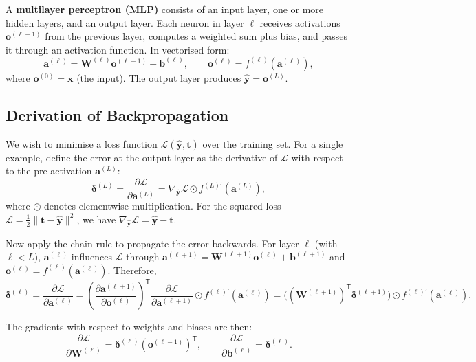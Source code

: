 \documentclass{tufte-handout}
\let\subsubsection\subsection
\begin{document}
A \textbf{multilayer perceptron (MLP)} consists of an input layer, one or more hidden layers, and an output layer. Each neuron in layer $\ell$ receives activations $\mathbf{o}^{(\ell-1)}$ from the previous layer, computes a weighted sum plus bias, and passes it through an activation function. In vectorised form:
\[
\mathbf{a}^{(\ell)} = \mathbf{W}^{(\ell)}\mathbf{o}^{(\ell-1)} + \mathbf{b}^{(\ell)},\qquad 
\mathbf{o}^{(\ell)} = f^{(\ell)}(\mathbf{a}^{(\ell)}),
\]
where $\mathbf{o}^{(0)} = \mathbf{x}$ (the input). The output layer produces $\hat{\mathbf{y}} = \mathbf{o}^{(L)}$.

\subsubsection{Derivation of Backpropagation}

We wish to minimise a loss function $\mathcal{L}(\hat{\mathbf{y}}, \mathbf{t})$ over the training set. For a single example, define the error at the output layer as the derivative of $\mathcal{L}$ with respect to the pre‑activation $\mathbf{a}^{(L)}$:
\[
\boldsymbol{\delta}^{(L)} = \frac{\partial \mathcal{L}}{\partial \mathbf{a}^{(L)}} = \nabla_{\hat{\mathbf{y}}}\mathcal{L} \odot f^{(L)'}(\mathbf{a}^{(L)}),
\]
where $\odot$ denotes elementwise multiplication. For the squared loss $\mathcal{L} = \frac12\|\mathbf{t}-\hat{\mathbf{y}}\|^2$, we have $\nabla_{\hat{\mathbf{y}}}\mathcal{L} = \hat{\mathbf{y}} - \mathbf{t}$.

Now apply the chain rule to propagate the error backwards. For layer $\ell$ (with $\ell < L$), $\mathbf{a}^{(\ell)}$ influences $\mathcal{L}$ through $\mathbf{a}^{(\ell+1)} = \mathbf{W}^{(\ell+1)}\mathbf{o}^{(\ell)} + \mathbf{b}^{(\ell+1)}$ and $\mathbf{o}^{(\ell)} = f^{(\ell)}(\mathbf{a}^{(\ell)})$. Therefore,
\[
\boldsymbol{\delta}^{(\ell)} = \frac{\partial \mathcal{L}}{\partial \mathbf{a}^{(\ell)}} 
= \left( \frac{\partial \mathbf{a}^{(\ell+1)}}{\partial \mathbf{o}^{(\ell)}} \right)^{\mathsf{T}} \frac{\partial \mathcal{L}}{\partial \mathbf{a}^{(\ell+1)}} \odot f^{(\ell)'}(\mathbf{a}^{(\ell)})
= \bigl( (\mathbf{W}^{(\ell+1)})^{\mathsf{T}} \boldsymbol{\delta}^{(\ell+1)} \bigr) \odot f^{(\ell)'}(\mathbf{a}^{(\ell)}).
\]

The gradients with respect to weights and biases are then:
\[
\frac{\partial \mathcal{L}}{\partial \mathbf{W}^{(\ell)}} = \boldsymbol{\delta}^{(\ell)} (\mathbf{o}^{(\ell-1)})^{\mathsf{T}},\qquad
\frac{\partial \mathcal{L}}{\partial \mathbf{b}^{(\ell)}} = \boldsymbol{\delta}^{(\ell)}.
\]
\end{document}

